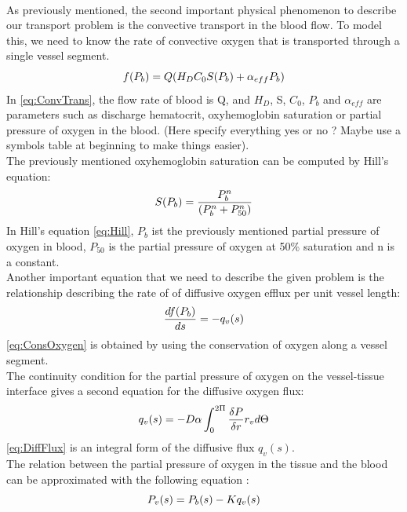 \\As previously mentioned, the second important physical phenomenon to describe our transport problem is the convective transport in the blood flow. To model this, we need to know the rate of convective oxygen that is transported through a single vessel segment.
\begin{equation}
\\f(P_b) = Q(H_DC_0S(P_b) + \alpha_{eff}P_b)
\label{eq:ConvTrans}
\end{equation}
%
In \ref{eq:ConvTrans}, the flow rate of blood is Q, and $H_D$, S, $C_0$, $P_b$ and $\alpha_{eff}$ are parameters such as discharge hematocrit, oxyhemoglobin saturation or partial pressure of oxygen in the blood. (Here specify everything yes or no ? Maybe use a symbols table at beginning to make things easier).
\\The previously mentioned oxyhemoglobin saturation can be computed by Hill's equation:
\begin{equation}
\\S(P_b) = \frac{P_b^n}{(P_b^n+P_{50}^n)}
\label{eq:Hill}
\end{equation}
In Hill's equation \ref{eq:Hill}, $P_b$ ist the previously mentioned partial pressure of oxygen in blood, $P_{50}$ is the partial pressure of oxygen at 50\% saturation and n is a constant.
%
\\Another important equation that we need to describe the given problem is the relationship describing the rate of of diffusive oxygen efflux per unit vessel length:
\begin{equation}
\\ \frac{df(P_b)}{ds} = -q_v(s)
\label{eq:ConsOxygen}
\end{equation}
\ref{eq:ConsOxygen} is obtained by using the conservation of oxygen along a vessel segment.
%
\\The continuity condition for the partial pressure of oxygen on the vessel-tissue interface gives a second equation for the diffusive oxygen flux:
\begin{equation}
\\q_v(s) = -D\alpha \int_{0}^{2\Pi} 
\frac{\delta P}{\delta r}r_v d \Theta
\label{eq:DiffFlux}
\end{equation}
\ref{eq:DiffFlux} is an integral form of the diffusive flux $q_v(s)$.
%
\\The relation between the partial pressure of oxygen in the tissue and the blood can be approximated with the following equation \cite{hellums1977resistance}:
\begin{equation}
\\P_v(s) = P_b(s) - Kq_v(s)
\label{eq:Hellums}
\end{equation}

